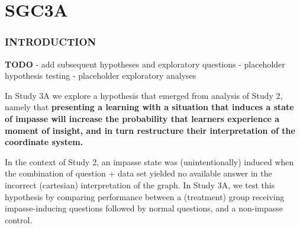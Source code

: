 \documentclass[
  letterpaper,
  DIV=11,
  numbers=noendperiod]{scrreprt}
\begin{document}
\part{SGC3A}

\newpage

\hypertarget{introduction}{%
\section*{INTRODUCTION}\label{introduction}}

\textbf{TODO} - add subsequent hypotheses and exploratory questions -
placeholder hypothesis testing - placeholder exploratory analyses

In Study 3A we explore a hypothesis that emerged from analysis of Study
2, namely that \textbf{presenting a learning with a situation that
induces a state of impasse will increase the probability that learners
experience a moment of insight, and in turn restructure their
interpretation of the coordinate system.}

In the context of Study 2, an impasse state was (unintentionally)
induced when the combination of question + data set yielded no available
answer in the incorrect (cartesian) interpretation of the graph. In
Study 3A, we test this hypothesis by comparing performance between a
(treatment) group receiving impasse-inducing questions followed by
normal questions, and a non-impasse control.
\end{document}
